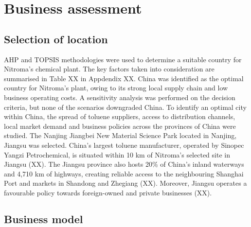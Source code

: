 \section{Business assessment}
\label{sec:economics}
\subsection{Selection of location} 
AHP and TOPSIS methodologies were used to determine a suitable country for Nitroma’s chemical plant. The key factors taken into consideration are summarised in Table XX in Appdendix XX. China was identified as the optimal country for Nitroma's plant, owing to its strong local supply chain and low business operating costs. A sensitivity analysis was performed on the decision criteria, but none of the scenarios downgraded China. To identify an optimal city within China, the spread of toluene suppliers, access to distribution channels, local market demand and business policies across the provinces of China were studied. The Nanjing Jiangbei New Material Science Park located in Nanjing, Jiangsu was selected. China’s largest toluene manufacturer, operated by Sinopec Yangzi Petrochemical, is situated within 10 km of Nitroma’s selected site in Jiangsu (XX). The Jiangsu province also hosts 20\% of China’s inland waterways and 4,710 km of highways, creating reliable access to the neighbouring Shanghai Port and markets in Shandong and Zhegiang (XX). Moreover, Jiangsu operates a favourable policy towards foreign-owned and private businesses (XX). 

\subsection{Business model} 
